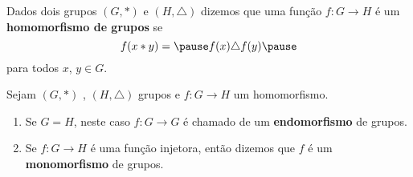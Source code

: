 \documentclass{beamer}
\begin{document}
    \begin{frame}
        \begin{definicao}
            Dados dois grupos $(G, *)$ \pause e $(H,\triangle)$ \pause dizemos que uma função $f : G \to H$ \pause é um \textbf{homomorfismo de grupos} se \pause
            \[
                f(x * y) = \pause f(x)\triangle f(y) \pause
            \]
            para todos $x$, $y \in G$.
        \end{definicao}
    \end{frame}

    \begin{frame}
        \begin{observacao}
            Sejam $(G, *)$ \pause, $(H, \triangle)$ grupos \pause e $f : G \to H$ um homomorfismo. \pause

            \vspace{.5cm}

            \begin{enumerate}[label={\arabic*})]
                \item Se $G = H$, \pause neste caso $f : G \to G$ \pause é chamado de um \textbf{endomorfismo} de grupos.\pause

                \vspace{.5cm}

                \item Se $f : G \to H$ é uma função injetora, \pause então dizemos que $f$ é um \textbf{monomorfismo} de grupos.\pause

                \vspace{.5cm}

                \seti
            \end{enumerate}
        \end{observacao}
    \end{frame}
\end{document}
